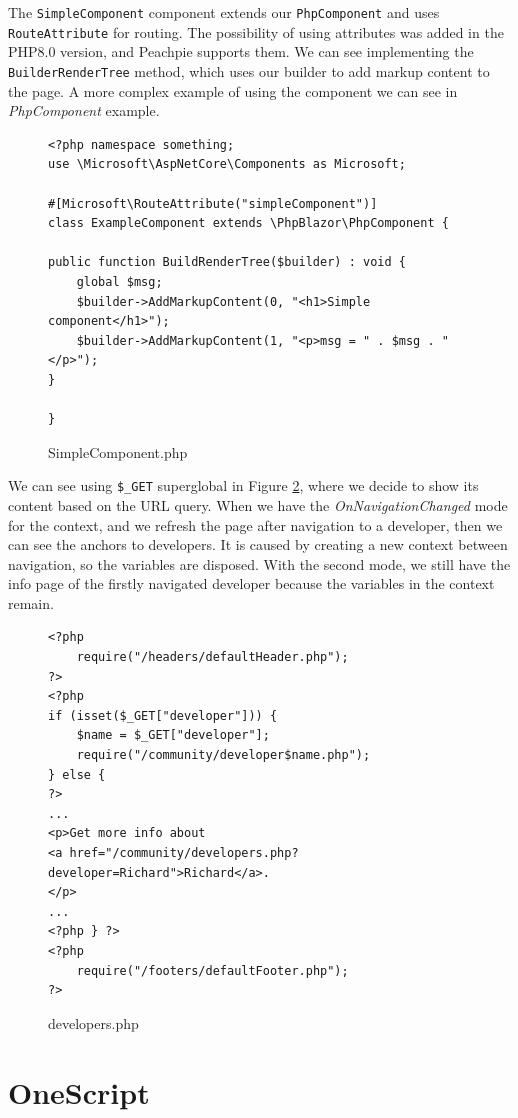 \par
The \texttt{SimpleComponent} component extends our \texttt{PhpComponent} and uses \texttt{RouteAttribute} for routing.
The possibility of using attributes was added in the PHP8.0 version, and Peachpie supports them.
We can see implementing the \texttt{BuilderRenderTree} method, which uses our builder to add markup content to the page.
A more complex example of using the component we can see in \textit{PhpComponent} example.
\par
\begin{figure}
\begin{lstlisting}
<?php namespace something;
use \Microsoft\AspNetCore\Components as Microsoft;

#[Microsoft\RouteAttribute("simpleComponent")]
class ExampleComponent extends \PhpBlazor\PhpComponent {	

public function BuildRenderTree($builder) : void {
	global $msg;
	$builder->AddMarkupContent(0, "<h1>Simple component</h1>");
	$builder->AddMarkupContent(1, "<p>msg = " . $msg . "</p>");
}

}
\end{lstlisting}
\caption{SimpleComponent.php}
\label{img24:component}
\end{figure}
\par
We can see using \texttt{\$\_GET} superglobal in Figure \ref{img25:developer}, where we decide to show its content based on the URL query.
When we have the \textit{OnNavigationChanged} mode for the context, and we refresh the page after navigation to a developer, then we can see the anchors to developers.
It is caused by creating a new context between navigation, so the variables are disposed.
With the second mode, we still have the info page of the firstly navigated developer because the variables in the context remain.
\par
\begin{figure}[H]
\begin{lstlisting}
<?php
    require("/headers/defaultHeader.php");
?>
<?php
if (isset($_GET["developer"])) { 
    $name = $_GET["developer"];
    require("/community/developer$name.php");
} else {
?>
...
<p>Get more info about 
<a href="/community/developers.php?developer=Richard">Richard</a>.
</p>
...
<?php } ?>
<?php
    require("/footers/defaultFooter.php");
?>
\end{lstlisting}
\caption{developers.php}
\label{img25:developer}
\end{figure}

\section{OneScript}

